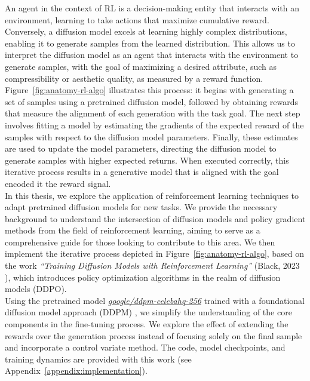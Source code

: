 \noindent An agent in the context of RL is a decision-making entity that interacts with an environment, learning to take actions that maximize cumulative reward. Conversely, a diffusion model excels at learning highly 
complex distributions, enabling it to generate samples from the learned 
distribution.  This allows us to interpret the diffusion model as an agent that interacts with the environment to generate samples, with the goal of maximizing a desired attribute, such as compressibility or aesthetic quality, as measured by a reward function. Figure~\ref{fig:anatomy-rl-algo} illustrates this process: it begins with generating a set of samples using a pretrained diffusion model, followed by obtaining rewards that measure the alignment of each generation with the task goal. The next step involves fitting a model by estimating the gradients of the expected reward of the samples with respect to the diffusion model parameters. Finally, these estimates are used to update the model parameters, directing the diffusion model to generate samples with higher expected returns. When executed correctly, this iterative process results in a generative model that is aligned with the goal encoded it the reward signal. \\

\noindent In this thesis, we explore the application of reinforcement learning techniques to adapt pretrained diffusion models for new tasks. We provide the necessary background to understand the intersection of diffusion models and policy gradient methods from the field of reinforcement learning, aiming to serve as a comprehensive guide for those looking to contribute to this area. We then implement the iterative process depicted in Figure~\ref{fig:anatomy-rl-algo}, based on the work \textit{``Training Diffusion Models with Reinforcement Learning''} (Black, 2023 \cite{black2023training}), which introduces policy optimization algorithms in the realm of diffusion models (DDPO). \\

\noindent Using the pretrained model \href{https://huggingface.co/google/ddpm-celebahq-256}{\textit{google/ddpm-celebahq-256}} trained with a foundational diffusion model approach (DDPM) \cite{ho2020denoising}, we 
simplify the understanding of the core components in the fine-tuning process. We explore the effect of extending the rewards over the generation process instead of focusing solely on the final sample and incorporate a control variate method. The code, model checkpoints, and training dynamics are provided with this work (see Appendix~\ref{appendix:implementation}). 

